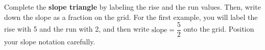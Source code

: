 \documentclass[12pt, a4paper, addpoints]{exam}
\begin{document}
\begin{questions}
\newpage
\renewcommand{\smallspace}{\vspace{4mm}}
\question Complete the \textbf{slope triangle} by labeling the rise and the run values. Then, write down the slope as a fraction on the grid. For the first example, you will label the rise with 5 and the run with 2, and then write $\text{slope} = \dfrac{5}{2}$ onto the grid. Position your slope notation carefully.
\begin{multicols}{3}
\end{multicols}
\end{questions}
\end{document}
